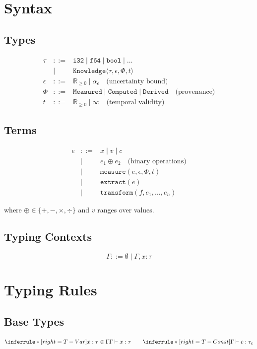 \documentclass[11pt]{article}
\begin{document}
\section{Syntax}

\subsection{Types}
\[
\begin{array}{rcl}
\tau & ::= & \texttt{i32} \mid \texttt{f64} \mid \texttt{bool} \mid \ldots \\
    & \mid & \texttt{Knowledge}\langle \tau, \epsilon, \Phi, t \rangle \\
\epsilon & ::= & \mathbb{R}_{\geq 0} \mid \alpha_\epsilon \quad \text{(uncertainty bound)} \\
\Phi & ::= & \texttt{Measured} \mid \texttt{Computed} \mid \texttt{Derived} \quad \text{(provenance)} \\
t & ::= & \mathbb{R}_{\geq 0} \mid \infty \quad \text{(temporal validity)}
\end{array}
\]

\subsection{Terms}
\[
\begin{array}{rcl}
e & ::= & x \mid v \mid c \\
  & \mid & e_1 \oplus e_2 \quad \text{(binary operations)} \\
  & \mid & \texttt{measure}(e, \epsilon, \Phi, t) \\
  & \mid & \texttt{extract}(e) \\
  & \mid & \texttt{transform}(f, e_1, \ldots, e_n)
\end{array}
\]

\noindent where $\oplus \in \{+, -, \times, \div\}$ and $v$ ranges over values.

\subsection{Typing Contexts}
\[
\Gamma ::= \emptyset \mid \Gamma, x : \tau
\]

\section{Typing Rules}

\subsection{Base Types}
\[
\inferrule*[right=T-Var]
  {x : \tau \in \Gamma}
  {\Gamma \vdash x : \tau}
\qquad
\inferrule*[right=T-Const]
  { }
  {\Gamma \vdash c : \tau_c}
\]
\end{document}
